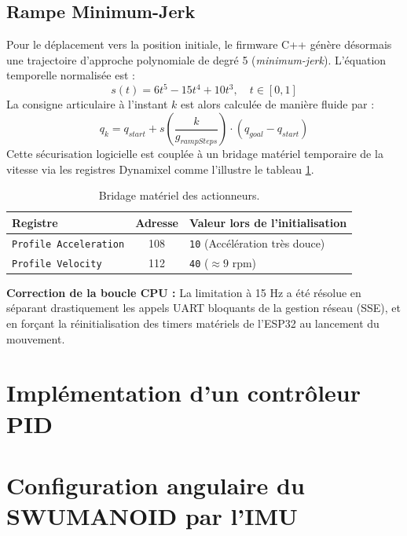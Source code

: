 \documentclass{tropLaClasse}
\begin{document}
\subsection{Rampe Minimum-Jerk} 

Pour le déplacement vers la position initiale, le firmware C++ génère désormais une trajectoire d'approche polynomiale de degré 5 (\textit{minimum-jerk}). L'équation temporelle normalisée est :
\begin{equation}
s(t) = 6t^5 - 15t^4 + 10t^3, \quad t \in [0,1]
\end{equation}
La consigne articulaire à l'instant $k$ est alors calculée de manière fluide par :
\begin{equation}
q_k = q_{start} + s\left(\frac{k}{g_{rampSteps}}\right) \cdot (q_{goal} - q_{start})
\end{equation}
Cette sécurisation logicielle est couplée à un bridage matériel temporaire de la vitesse via les registres Dynamixel comme l'illustre le tableau \ref{tab:hardware_profile}.
    
\begin{table}[h]
\centering
\begin{tabular}{|l|c|l|}
\hline
\textbf{Registre} & \textbf{Adresse} & \textbf{Valeur lors de l'initialisation} \\ \hline
\texttt{Profile Acceleration} & 108 & \texttt{10} (Accélération très douce) \\ \hline
\texttt{Profile Velocity} & 112 & \texttt{40} ($\approx 9$ rpm) \\ \hline
\end{tabular}
\caption{Bridage matériel des actionneurs.}
\label{tab:hardware_profile}
\end{table}

\textbf{Correction de la boucle CPU :} La limitation à 15 Hz a été résolue en séparant drastiquement les appels UART bloquants de la gestion réseau (SSE), et en forçant la réinitialisation des timers matériels de l'ESP32 au lancement du mouvement.

\section{Implémentation d'un contrôleur PID}



\section{Configuration angulaire du SWUMANOID par l'IMU}
\end{document}
